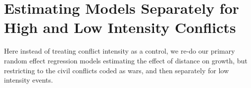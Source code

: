 \documentclass[12pt,onesided]{amsart}
\begin{document}

\FloatBarrier

\clearpage
\section{Estimating Models Separately for High and Low Intensity Conflicts}

Here instead of treating conflict intensity as a control, we re-do our primary random effect regression models estimating the effect of distance on growth, but restricting to the civil conflicts coded as wars, and then separately for low intensity events. 


\FloatBarrier
\clearpage

\newpage



\newpage
\end{document}
